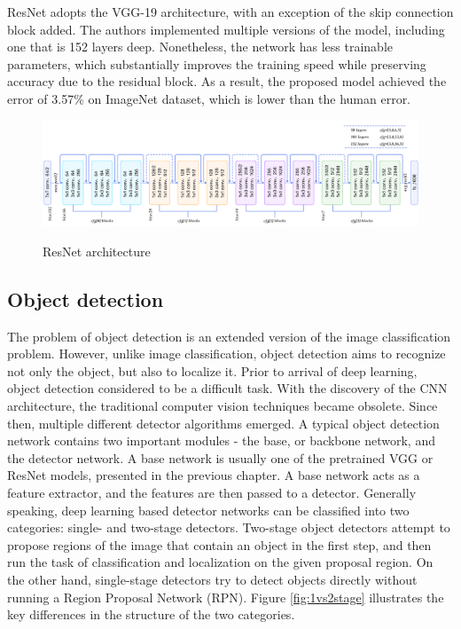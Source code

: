 \documentclass[english, 12pt, a4paper, elec, utf8, a-1b, online]{aaltothesis}
\begin{document}
ResNet adopts the VGG-19 architecture, with an exception of the skip connection block added. The authors implemented multiple versions of the model, including one that is 152 layers deep. Nonetheless, the network has less trainable parameters, which substantially improves the training speed while preserving accuracy due to the residual block. As a result, the proposed model achieved the error of 3.57\% on ImageNet dataset, which is lower than the human error. \cite{He2015}

\begin{figure}[htb]
	\begin{center}
		\includegraphics[width=16cm]{./resnetFull.png}
	\end{center}
	\caption{ResNet architecture\cite{resnet50}}
	\begin{center}
		\label{resnetFull}
	\end{center}
\end{figure}
\FloatBarrier




\subsection{Object detection}
The problem of object detection is an extended version of the image classification problem. However, unlike image classification, object detection aims to recognize not only the object, but also to localize it. Prior to arrival of deep learning, object detection considered to be a difficult task. With the discovery of the CNN architecture, the traditional computer vision techniques became obsolete. Since then, multiple different detector algorithms emerged. A typical object detection network contains two important modules - the base, or backbone network, and the detector network. A base network is usually one of the pretrained VGG or ResNet models, presented in the previous chapter. A base network acts as a feature extractor, and the features are then passed to a detector. Generally speaking, deep learning based detector networks can be classified into two categories: single- and two-stage detectors. \cite{Zaidi2021} Two-stage object detectors attempt to propose regions of the image that contain an object in the first step, and then run the task of classification and localization on the given proposal region. On the other hand, single-stage detectors try to detect objects directly without running a Region Proposal Network (RPN). Figure \ref{fig:1vs2stage} illustrates the key differences in the structure of the two categories. 
\end{document}
